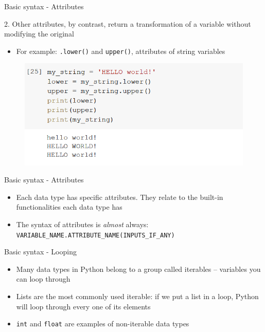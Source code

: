 \documentclass[aspectratio=169]{beamer}
\begin{document}
\begin{frame}{Basic syntax - Attributes}

	2. Other attributes, by contrast, return a transformation of a variable without modifying the original
		
	\begin{itemize}
		\item For example: \texttt{.lower()} and \texttt{upper()}, attributes of string variables
	\end{itemize}

	\begin{figure}
		\centering
		\includegraphics[width=0.6\linewidth]{img/string_lower_upper.png}
	\end{figure}

\end{frame}

\begin{frame}{Basic syntax - Attributes}

	\begin{itemize}
		\item Each data type has specific attributes. They relate to the built-in functionalities each data type has
		\item The syntax of attributes is \textit{almost} always: \texttt{VARIABLE\_NAME.ATTRIBUTE\_NAME(INPUTS\_IF\_ANY)}
	\end{itemize}

\end{frame}

\begin{frame}{Basic syntax - Looping}

	\begin{itemize}
		\item Many data types in Python belong to a group called iterables -- variables you can loop through
		\item Lists are the most commonly used iterable: if we put a list in a loop, Python will loop through every one of its elements
		\item \texttt{int} and \texttt{float} are examples of non-iterable data types
	\end{itemize}

\end{frame}
\end{document}
